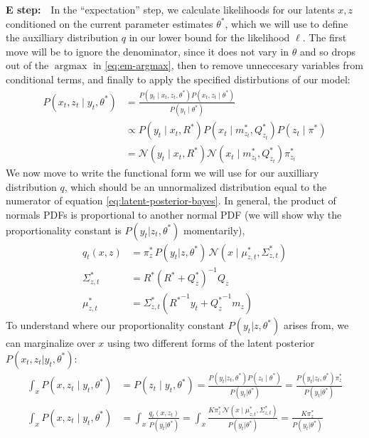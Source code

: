 \documentclass{article}         %
\DeclareMathOperator{\argmax}{\arg\max}
\newcommand{\inv}{^{-1}}
\newcommand{\NN}{\mathcal{N}}
\newcommand{\pn}[1]{\left( #1 \right)}
\begin{document}
\textbf{E step:}\ \ In the ``expectation'' step, we calculate likelihoods for our latents $x,z$ conditioned on the current parameter estimates $\theta^*$, which we will use to define the auxilliary distribution $q$ in our lower bound for the likelihood $\ell$.
The first move will be to ignore the denominator, since it does not vary in $\theta$ and so drops out of the $\argmax$ in \ref{eq:em-argmax}, then to remove unneccesary variables from conditional terms, and finally to apply the specified distirbutions of our model:
\begin{align}
    \label{eq:latent-posterior-bayes-paired-down}
    P(x_t, z_t \mid y_t, \theta^*) &= \frac{P(y_t \mid x_t, z_t, \theta^*)P(x_t, z_t \mid \theta^*)}{P(y_t \mid \theta^*)} \\
    &\propto P(y_t \mid x_t, R^*) P(x_t \mid m^*_{z_t}, Q^*_{z_t}) P(z_t \mid \pi^*) \\
    &= \NN(y_t \mid x_t, R^*) \NN(x_t \mid m^*_{z_t}, Q^*_{z_t}) \pi_{z_t}^*
\end{align}
We now move to write the functional form we will use for our auxilliary distribution $q$, which should be an unnormalized distribution equal to the numerator of equation \ref{eq:latent-posterior-bayes}. In general, the product of normals PDFs is proportional to another normal PDF (we will show why the proportionality constant is $P(y_t | z_t, \theta^*)$ momentarily),
\begin{align}
    q_t(x, z) &= \pi_{z}^*\, P(y_t | z, \theta^*)\, \NN(x \mid \mu^*_{z, t}, \Sigma^*_{z, t}) \\
    \Sigma_{z, t}^* &= R^* \pn{R^* + Q^*_{z}}\inv Q_{z} \\
    \mu_{z, t}^* &= \Sigma_{z, t}^* \pn{ {R^*}\inv y_t + {Q^*_z}\inv m_{z} }
\end{align}
To understand where our proportionality constant $P(y_t | z, \theta^*)$ arises from, we can marginalize over $x$ using two different forms of the latent posterior $P(x_t, z_t | y_t, \theta^*)$:
\begin{align}
    \int_x P(x, z_t \mid y_t, \theta^*)
    &= P(z_t \mid y_t, \theta^*)
    = \frac{P(y_t | z_t, \theta^*) P(z_t \mid \theta^*)}{P(y_t | \theta^*)}
    =  \frac{P(y_t | z_t, \theta^*) \pi_{z}^*}{P(y_t | \theta^*)}\\
    \int_x P(x, z_t \mid y_t, \theta^*)
    &= \int_x \frac{q_t(x, z_t)}{P(y_t | \theta^*)}
    = \int_x \frac{K \pi_{z}^*\, \NN(x \mid \mu^*_{z, t}, \Sigma^*_{z, t})}{P(y_t | \theta^*)}
    =  \frac{K \pi_{z}^*}{P(y_t | \theta^*)}
\end{align}
\end{document}
